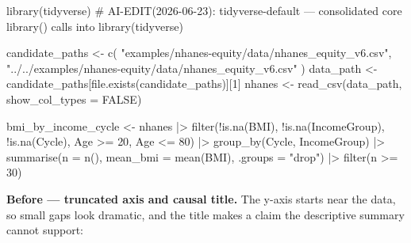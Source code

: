 \documentclass[
  letterpaper,
  DIV=11,
  numbers=noendperiod,
  oneside]{scrreprt}
\newenvironment{Shaded}{\begin{snugshade}}{\end{snugshade}}
\newcommand{\AttributeTok}[1]{\textcolor[rgb]{0.40,0.45,0.13}{#1}}
\newcommand{\CommentTok}[1]{\textcolor[rgb]{0.37,0.37,0.37}{#1}}
\newcommand{\ConstantTok}[1]{\textcolor[rgb]{0.56,0.35,0.01}{#1}}
\newcommand{\DecValTok}[1]{\textcolor[rgb]{0.68,0.00,0.00}{#1}}
\newcommand{\FunctionTok}[1]{\textcolor[rgb]{0.28,0.35,0.67}{#1}}
\newcommand{\NormalTok}[1]{\textcolor[rgb]{0.00,0.23,0.31}{#1}}
\newcommand{\OtherTok}[1]{\textcolor[rgb]{0.00,0.23,0.31}{#1}}
\newcommand{\SpecialCharTok}[1]{\textcolor[rgb]{0.37,0.37,0.37}{#1}}
\newcommand{\StringTok}[1]{\textcolor[rgb]{0.13,0.47,0.30}{#1}}
\begin{document}
\begin{Shaded}
\begin{Highlighting}[numbers=left,,]
\FunctionTok{library}\NormalTok{(tidyverse) }\CommentTok{\# AI{-}EDIT(2026{-}06{-}23): tidyverse{-}default — consolidated core library() calls into library(tidyverse)}

\NormalTok{candidate\_paths }\OtherTok{\textless{}{-}} \FunctionTok{c}\NormalTok{(}
  \StringTok{"examples/nhanes{-}equity/data/nhanes\_equity\_v6.csv"}\NormalTok{,}
  \StringTok{"../../examples/nhanes{-}equity/data/nhanes\_equity\_v6.csv"}
\NormalTok{)}
\NormalTok{data\_path }\OtherTok{\textless{}{-}}\NormalTok{ candidate\_paths[}\FunctionTok{file.exists}\NormalTok{(candidate\_paths)][}\DecValTok{1}\NormalTok{]}
\NormalTok{nhanes }\OtherTok{\textless{}{-}} \FunctionTok{read\_csv}\NormalTok{(data\_path, }\AttributeTok{show\_col\_types =} \ConstantTok{FALSE}\NormalTok{)}

\NormalTok{bmi\_by\_income\_cycle }\OtherTok{\textless{}{-}}\NormalTok{ nhanes }\SpecialCharTok{|\textgreater{}}
  \FunctionTok{filter}\NormalTok{(}\SpecialCharTok{!}\FunctionTok{is.na}\NormalTok{(BMI), }\SpecialCharTok{!}\FunctionTok{is.na}\NormalTok{(IncomeGroup), }\SpecialCharTok{!}\FunctionTok{is.na}\NormalTok{(Cycle), Age }\SpecialCharTok{\textgreater{}=} \DecValTok{20}\NormalTok{, Age }\SpecialCharTok{\textless{}=} \DecValTok{80}\NormalTok{) }\SpecialCharTok{|\textgreater{}}
  \FunctionTok{group\_by}\NormalTok{(Cycle, IncomeGroup) }\SpecialCharTok{|\textgreater{}}
  \FunctionTok{summarise}\NormalTok{(}\AttributeTok{n =} \FunctionTok{n}\NormalTok{(), }\AttributeTok{mean\_bmi =} \FunctionTok{mean}\NormalTok{(BMI), }\AttributeTok{.groups =} \StringTok{"drop"}\NormalTok{) }\SpecialCharTok{|\textgreater{}}
  \FunctionTok{filter}\NormalTok{(n }\SpecialCharTok{\textgreater{}=} \DecValTok{30}\NormalTok{)}
\end{Highlighting}
\end{Shaded}

\textbf{Before --- truncated axis and causal title.} The y-axis starts
near the data, so small gaps look dramatic, and the title makes a claim
the descriptive summary cannot support:
\end{document}
